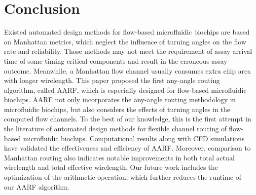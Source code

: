 \documentclass[journal]{IEEEtran}
\begin{document}
\section{Conclusion}
\label{sec:cln}

Existed automated design methods for flow-based microfluidic biochips are based on Manhattan metrics, which neglect the influence of turning angles on the flow rate and reliability. 
Those methods may not meet the requirement of assay arrival time of some timing-critical components and result in the erroneous assay outcome. 
Meanwhile, a Manhattan flow channel usually consumes extra chip area with longer wirelength. 
This paper proposed the first any-angle routing algorithm, called AARF, which is especially designed for flow-based microfluidic biochips. AARF not only incorporates the any-angle routing methodology in microfluidic biochips, but also considers the effects of turning angles in the computed flow channels. To the best of our knowledge, this is the first attempt in the literature of automated design methods for flexible channel routing of flow-based microfluidic biochips.
Computational results along with CFD simulations have validated the effectiveness and efficiency of AARF. 
Moreover, comparison to Manhattan routing also indicates notable improvements in both total actual wirelength and total effective wirelength. Our future work includes the optimization of the arithmetic operation, which further reduces the runtime of our AARF algorithm.
\end{document}
